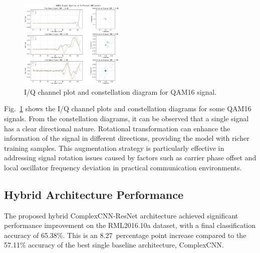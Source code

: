\documentclass[conference]{IEEEtran}
\begin{document}
\begin{figure}[htbp]
\centering
\includegraphics[width=0.45\textwidth]{figure/QAM16_rotation.png}
\caption{I/Q channel plot and constellation diagram for QAM16 signal.}
\label{fig:rotation_augmentation}
\end{figure}

Fig.~\ref{fig:rotation_augmentation} shows the I/Q channel plots and constellation diagrams for some QAM16 signals. From the constellation diagrams, it can be observed that a single signal has a clear directional nature. Rotational transformation can enhance the information of the signal in different directions, providing the model with richer training samples. This augmentation strategy is particularly effective in addressing signal rotation issues caused by factors such as carrier phase offset and local oscillator frequency deviation in practical communication environments.


\subsection{Hybrid Architecture Performance}

The proposed hybrid ComplexCNN-ResNet architecture achieved significant performance improvement on the RML2016.10a dataset, with a final classification accuracy of 65.38\%. This is an 8.27~percentage point increase compared to the 57.11\% accuracy of the best single baseline architecture, ComplexCNN.
\end{document}

